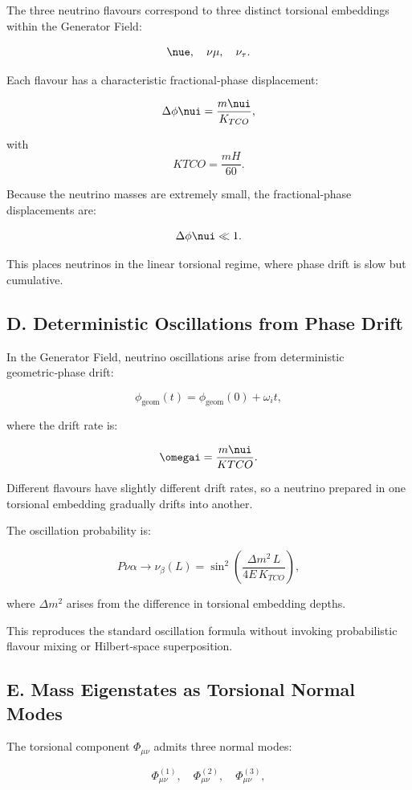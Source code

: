 \documentclass[reprint,amsmath,amssymb,aps,prl,floatfix]{revtex4-2}
\begin{document}
The three neutrino flavours correspond to three distinct torsional embeddings within the Generator Field:
\medskip

\[
\nue,\quad \nu\mu,\quad \nu_\tau.
\]

Each flavour has a characteristic fractional‑phase displacement:

\[
\Delta\phi{\nui} = \frac{m{\nui}}{K_{TCO}},
\]

with  
\[
K{TCO} = \frac{mH}{60}.
\]

Because the neutrino masses are extremely small, the fractional‑phase displacements are:

\[
\Delta\phi{\nui} \ll 1.
\]

This places neutrinos in the linear torsional regime, where phase drift is slow but cumulative.

\subsection{D. Deterministic Oscillations from Phase Drift}

In the Generator Field, neutrino oscillations arise from deterministic geometric‑phase drift:

\[
\phi_{\mathrm{geom}}(t)
=
\phi_{\mathrm{geom}}(0)
+
\omega_i t,
\]

where the drift rate is:

\[
\omegai = \frac{m{\nui}}{K{TCO}}.
\]

Different flavours have slightly different drift rates, so a neutrino prepared in one torsional embedding gradually drifts into another.
\medskip

The oscillation probability is:

\[
P{\nu\alpha \rightarrow \nu_\beta}(L)
=
\sin^2\!\left(
\frac{\Delta m^2\,L}{4E\,K_{TCO}}
\right),
\]

where \(\Delta m^2\) arises from the difference in torsional embedding depths.
\medskip

This reproduces the standard oscillation formula without invoking probabilistic flavour mixing or Hilbert‑space superposition.

\subsection{E. Mass Eigenstates as Torsional Normal Modes}

The torsional component \(\Phi_{\mu\nu}\) admits three normal modes:

\[
\Phi_{\mu\nu}^{(1)},\quad
\Phi_{\mu\nu}^{(2)},\quad
\Phi_{\mu\nu}^{(3)},
\]
\end{document}
